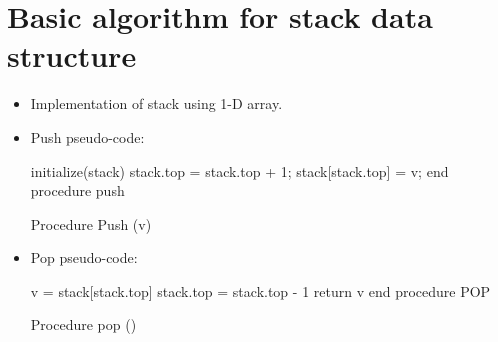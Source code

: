 \section{Basic algorithm for stack data structure}
\begin{itemize}
    \item Implementation of stack using 1-D array.
        
    
    \item Push pseudo-code:
        \begin{center}
            \begin{algorithm}[H]
                \SetAlgoLined
                initialize(stack)\; 
                stack.top = stack.top + 1; \;
                stack[stack.top] = v; \;
                end procedure push\; 
                \caption{Procedure Push (v)}
            \end{algorithm}
        \end{center}
    
    \item Pop pseudo-code:
        \begin{center}
            \begin{algorithm}[H]
                \SetAlgoLined
                \large
                v = stack[stack.top]\;
                stack.top = stack.top - 1\; 
                return v\; 
                end procedure POP\;
                \caption{Procedure pop ()}
            \end{algorithm}
        \end{center}
\end{itemize}


